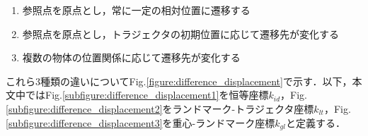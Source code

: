	\begin{enumerate}
		\item 参照点を原点とし，常に一定の相対位置に遷移する
		\item 参照点を原点とし，トラジェクタの初期位置に応じて遷移先が変化する
		\item 複数の物体の位置関係に応じて遷移先が変化する
	\end{enumerate}
これら3種類の違いについてFig.\ref{figure:difference_displacement}で示す．以下，本文中ではFig.\ref{subfigure:difference_displacement1}を恒等座標$k_{id}$，Fig.\ref{subfigure:difference_displacement2}をランドマーク-トラジェクタ座標$k_{lt}$，Fig.\ref{subfigure:difference_displacement3}を重心-ランドマーク座標$k_{gl}$と定義する．



